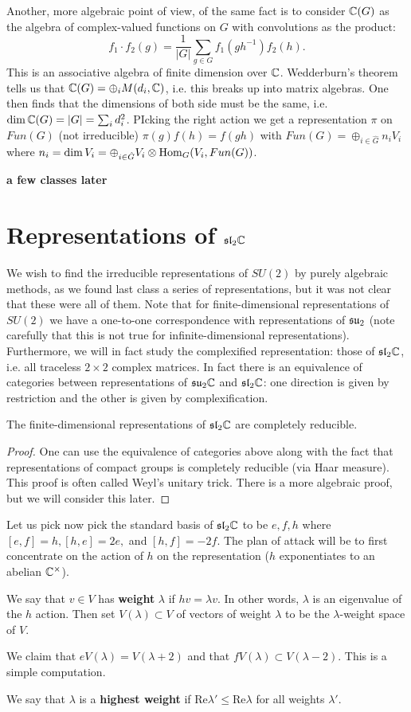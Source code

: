 \documentclass{../mathnotes}
\begin{document}
Another, more algebraic point of view, of the same fact is to consider $\mathbb{C}(G)$ as the algebra of complex-valued functions on $G$ with convolutions
as the product:
\[f_1\cdot f_2(g)=\frac{1}{|G|}\sum_{g\in G}f_1(gh^{-1})f_2(h).\]
This is an associative algebra of finite dimension over $\mathbb{C}$. Wedderburn's theorem tells us that $\mathbb{C}(G)=\oplus_i M(d_i,\mathbb{C})$, i.e. this breaks up
into matrix algebras. One then finds that the dimensions of both side must be the same, i.e. $\dim\mathbb{C}(G)=|G|=\sum_id_i^2$. PIcking the right action
we get a representation $\pi$ on $Fun(G)$ (not irreducible) $\pi(g)f(h)=f(gh)$ with $Fun(G)=\oplus_{i\in\hat G}n_iV_i$ where $n_i=\dim V_i=\oplus_{i\in\hat G}V_i\otimes\operatorname{Hom}_G(V_i,Fun(G))$.



\textbf{a few classes later}

\section{Representations of $\mathfrak{sl}_2\mathbb{C}$}

We wish to find the irreducible representations of $SU(2)$ by purely algebraic methods, as we found last class a series of representations, but it was not clear
that these were all of them. Note that for finite-dimensional representations of $SU(2)$ we have a one-to-one correspondence with representations of $\mathfrak{su}_2$
(note carefully that this is not true for infinite-dimensional representations). Furthermore, we will in fact study the complexified representation: those of $\mathfrak{sl}_2\mathbb{C}$,
i.e. all traceless $2\times 2$ complex matrices. In fact there is an equivalence of categories between representations of $\mathfrak{su}_2\mathbb{C}$ and $\mathfrak{sl}_2\mathbb{C}$: one direction
is given by restriction and the other is given by complexification.

\begin{thm}
    The finite-dimensional representations of $\mathfrak{sl}_2\mathbb{C}$ are completely reducible.
\end{thm}
\begin{proof}
    One can use the equivalence of categories above along with the fact that representations of compact groups is completely reducible (via Haar measure).
    This proof is often called Weyl's unitary trick. There is a more algebraic proof, but we will consider this later.
\end{proof}

Let us pick now pick the standard basis of $\mathfrak{sl}_2\mathbb{C}$ to be $e,f,h$ where $[e,f]=h,[h,e]=2e,$ and $[h,f]=-2f$. The plan of attack will be to first concentrate
on the action of $h$ on the representation ($h$ exponentiates to an abelian $\mathbb{C}^\times$).
\begin{defn}
    We say that $v\in V$ has \textbf{weight} $\lambda$ if $hv=\lambda v$. In other words, $\lambda$ is an eigenvalue of the $h$ action. Then set
    $V(\lambda)\subset V$ of vectors of weight $\lambda$ to be the $\lambda$-weight space of $V$.
\end{defn}

We claim that $eV(\lambda)=V(\lambda+2)$ and that $fV(\lambda)\subset V(\lambda-2)$. This is a simple computation.

\begin{defn}
    We say that $\lambda$ is a \textbf{highest weight} if $\text{Re}\lambda'\leq\text{Re}\lambda$ for all weights $\lambda'$.
\end{defn}
\end{document}
